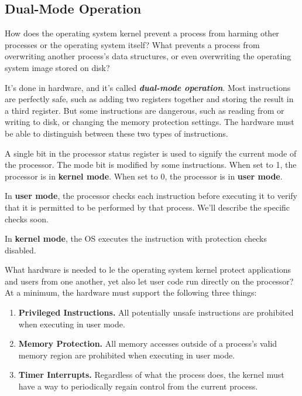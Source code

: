 \documentclass{article}
\begin{document}
\subsection{Dual-Mode Operation}
How does the operating system kernel prevent a process from harming other processes or the operating system itself? What prevents a process from overwriting another process's data structures, or even overwriting the operating system image stored on disk?

It's done in hardware, and it's called \textbf{\textit{dual-mode operation}}. Most instructions are perfectly safe, such as adding two registers together and storing the result in a third register. But some instructions are dangerous, such as reading from or writing to disk, or changing the memory protection settings. The hardware must be able to distinguish between these two types of instructions.

\begin{definition}
    A single bit in the processor status register is used to signify the current mode of the processor. The mode bit is modified by some instructions. When set to 1, the processor is in \textbf{kernel mode}. When set to 0, the processor is in \textbf{user mode}.

    In \textbf{user mode}, the processor checks each instruction before executing it to verify that it is permitted to be performed by that process. We'll describe the specific checks soon.

    In \textbf{kernel mode}, the OS executes the instruction with protection checks disabled.
\end{definition}
What hardware is needed to le the operating system kernel protect applications and users from one another, yet also let user code run directly on the processor? At a minimum, the hardware must support the following three things:

\begin{enumerate}
    \item \textbf{Privileged Instructions.} All potentially unsafe instructions are prohibited when executing in user mode.
    \item \textbf{Memory Protection.} All memory accesses outside of a process's valid memory region are prohibited when executing in user mode.
    \item \textbf{Timer Interrupts.} Regardless of what the process does, the kernel must have a way to periodically regain control from the current process.
\end{enumerate}
\end{document}
